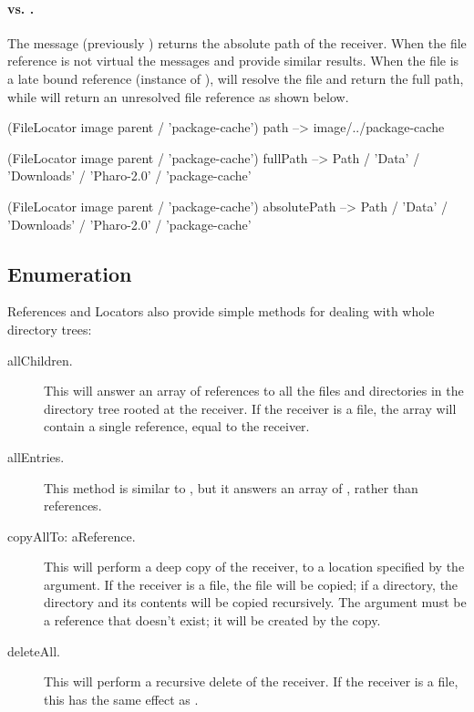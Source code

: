 \documentclass[a4paper,10pt,twoside]{book}
\begin{document}
\paragraph{ vs. .} The message   (previously ) returns the absolute path of the receiver. When the file reference is not virtual the messages  and  provide similar results.
When the file is a late bound reference (instance of ),  will resolve the file and return the full path, while  will return an unresolved file reference as shown below.


\begin{code}{}
(FileLocator image parent / 'package-cache') path
--> {image}/../package-cache

(FileLocator image parent / 'package-cache') fullPath
--> Path / 'Data' / 'Downloads' / 'Pharo-2.0' / 'package-cache'

(FileLocator image parent / 'package-cache') absolutePath
--> Path / 'Data' / 'Downloads' / 'Pharo-2.0' / 'package-cache'
\end{code}


\subsection{Enumeration}

References and Locators also provide simple methods for dealing with whole directory trees:

\begin{description}
\item[allChildren.]

This will answer an array of references to all the files and directories in the directory tree rooted at the receiver. If the receiver is a file, the array will contain a single reference, equal to the receiver.

\item[allEntries.]
This method is similar to , but it answers an array of , rather than references.

\item[copyAllTo: aReference.]

This will perform a deep copy of the receiver, to a location specified by the argument. If the receiver is a file, the file will be copied; if a directory, the directory and its contents will be copied recursively. The argument must be a reference that doesn't exist; it will be created by the copy.

\item[deleteAll.]

This will perform a recursive delete of the receiver. If the receiver is a file, this has the same effect as .
\end{description}
\end{document}

